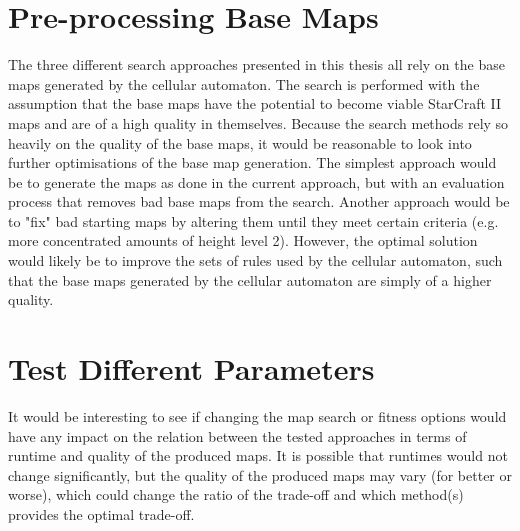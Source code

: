 \section{Pre-processing Base Maps}
\label{futurework_preprocess}
The three different search approaches presented in this thesis all rely on the base maps generated by the cellular automaton. The search is performed with the assumption that the base maps have the potential to become viable StarCraft II maps and are of a high quality in themselves. Because the search methods rely so heavily on the quality of the base maps, it would be reasonable to look into further optimisations of the base map generation. The simplest approach would be to generate the maps as done in the current approach, but with an evaluation process that removes bad base maps from the search. Another approach would be to "fix" bad starting maps by altering them until they meet certain criteria (e.g. more concentrated amounts of height level 2). However, the optimal solution would likely be to improve the sets of rules used by the cellular automaton, such that the base maps generated by the cellular automaton are simply of a higher quality.

\section{Test Different Parameters}
\label{futurework_differentparameters}
It would be interesting to see if changing the map search or fitness options would have any impact on the relation between the tested approaches in terms of runtime and quality of the produced maps. It is possible that runtimes would not change significantly, but the quality of the produced maps may vary (for better or worse), which could change the ratio of the trade-off and which method(s) provides the optimal trade-off.